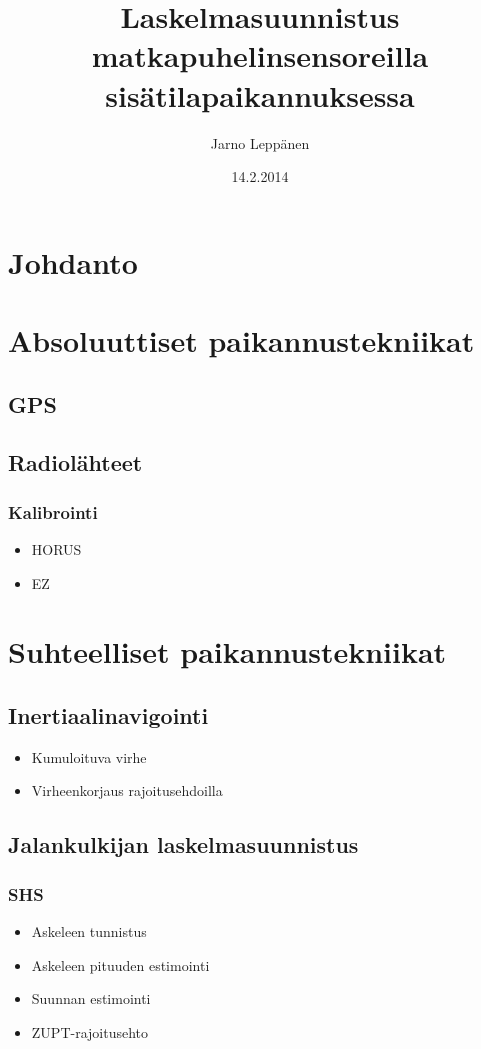 \documentclass[a4paper]{scrartcl}
\author{Jarno Leppänen}
\title{Laskelmasuunnistus matkapuhelinsensoreilla sisätilapaikannuksessa}
\date{14.2.2014}
\begin{document}
\maketitle

\tableofcontents

\section{Johdanto}

\section{Absoluuttiset paikannustekniikat}
\subsection{GPS}
\cite{groves2013principles}
\subsection{Radiolähteet}
\cite{varshavsky2005gsm}
\subsubsection{Kalibrointi}
\begin{itemize}
\item HORUS
\item EZ
\end{itemize}

\section{Suhteelliset paikannustekniikat}
\subsection{Inertiaalinavigointi}
\begin{itemize}
\item Kumuloituva virhe
\item Virheenkorjaus rajoitusehdoilla
\end{itemize}
\cite{groves2013principles}
\subsection{Jalankulkijan laskelmasuunnistus}
\cite{harle2013survey}
\subsubsection{SHS}
\begin{itemize}
\item Askeleen tunnistus
\item Askeleen pituuden estimointi
\item Suunnan estimointi
\item ZUPT-rajoitusehto
\end{itemize}
\end{document}
